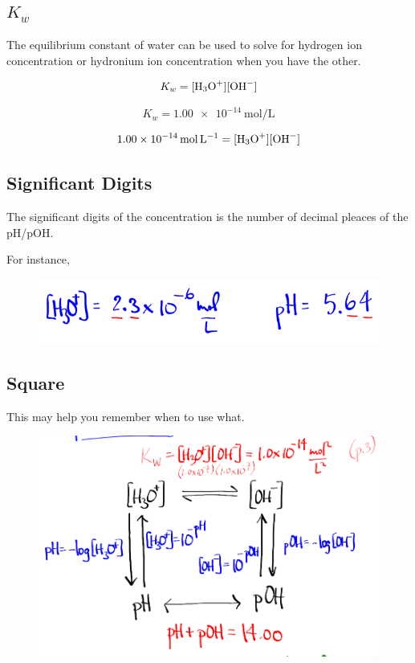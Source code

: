 \documentclass[a4paper,12pt]{article}
\begin{document}
\subsection{$K_w$}
The equilibrium constant of water can be used to solve for hydrogen ion concentration or hydronium ion concentration when you have the other.

$$K_w = [\ce{H3O+}][\ce{OH-}]$$

$$K_w = \SI{1.00e-14}{\mol\per\L}$$

$$\SI{1.00e-14}{\mol\per\L} = [\ce{H3O+}][\ce{OH-}]$$

\subsection{Significant Digits}
The significant digits of the concentration is the number of decimal pleaces of the pH/pOH.

For instance,
\begin{figure}[H]
    \includegraphics[width=\textwidth]{ph-sigdigs}
\end{figure}

\subsection{Square}
This may help you remember when to use what.
\begin{figure}[H]
    \includegraphics[width=\textwidth]{ph-square}
\end{figure}
\end{document}
